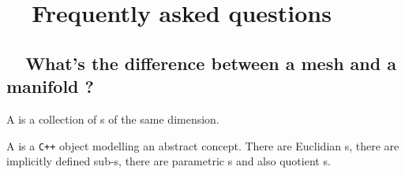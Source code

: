 
\chapter {~~{Frequently asked questions}}\label{\numb section 13}

\section{~~What's the difference between a mesh and a manifold ?}
\label{\numb section 13.\numb parag 1}

A {\small\tt{}} is a collection of {\small\tt{}}s of the
same dimension.

A {\small\tt{}} is a {\tt C++} object modelling an abstract concept.
There are Euclidian {\small\tt{}}s, there are implicitly defined
sub-{\small\tt{}}s, there are parametric {\small\tt{}}s
and also quotient {\small\tt{}}s.
